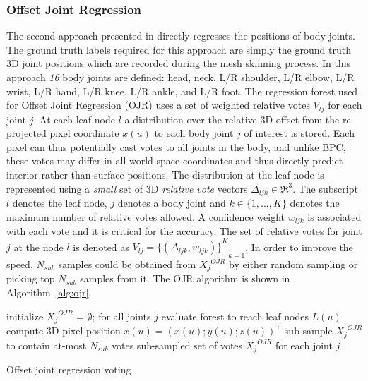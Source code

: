 \subsubsection{Offset Joint Regression} The second approach presented in \cite{shotton2013efficient} directly regresses the positions of body joints. The ground truth labels required for this approach are simply the ground truth 3D joint positions which are recorded during the mesh skinning process. In this approach \emph{16} body joints are defined: head, neck, L/R shoulder, L/R elbow, L/R wrist, L/R hand, L/R knee, L/R ankle, and L/R foot. The regression forest used for Offset Joint Regression (OJR) uses a set of weighted relative votes $V_{lj}$ for each joint $j$. At each leaf node $l$ a distribution over the relative 3D offset from the re-projected pixel coordinate $x(u)$ to each body joint $j$ of interest is stored. Each pixel can thus potentially cast votes to all joints in the body, and unlike BPC, these votes may differ in all world space coordinates and thus directly predict interior rather than surface positions. The distribution at the leaf node is represented using a \emph{small} set of 3D \emph{relative vote} vectors $\Delta_{ljk} \in \Re^3$. The subscript $l$ denotes the leaf node, $j$ denotes a body joint and $k \in \lbrace 1,...,K \rbrace$ denotes the maximum number of relative votes allowed. A confidence weight $w_{ljk}$ is associated with each vote and it is critical for the accuracy. The set of relative votes for joint $j$ at the node $l$ is denoted as $V_{lj}={{\lbrace (\Delta_{ljk},w_{ljk}) \rbrace}^K}_{k=1}$. In order to improve the speed, $N_{sub}$ samples could be obtained from ${X_j}^{OJR}$ by either random sampling or picking top $N_{sub}$ samples from it. The OJR algorithm is shown in Algorithm~\ref{alg:ojr}

\begin{algorithm}
 initialize ${X_j}^{OJR}$ = $\emptyset$; for all joints $j$ \;
  { 
   evaluate forest to reach leaf nodes $L(u)$ \;
   compute 3D pixel position $x(u) = (x(u); y(u); z(u))^\text{T}$ \;
  }
  sub-sample ${X_j}^{OJR}$ to contain at-most $N_{sub}$ votes \;
  \Return sub-sampled set of votes ${X_j}^{OJR}$ for each joint $j$ \;
 \caption{Offset joint regression voting}
 \label{alg:ojr}
\end{algorithm}

